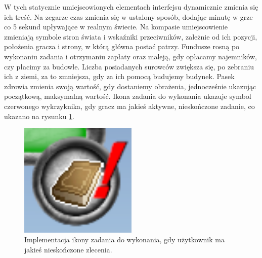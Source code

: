 W tych statycznie umiejscowionych elementach interfejsu dynamicznie zmienia się ich treść. Na zegarze czas zmienia się w ustalony sposób,
dodając minutę w grze co 5 sekund upływające w realnym świecie. Na kompasie umiejscowienie zmieniają symbole stron świata i wskaźniki przeciwników,
zależnie od ich pozycji, położenia gracza i strony, w którą główna postać patrzy. Fundusze rosną po wykonaniu zadania i otrzymaniu zapłaty oraz maleją, gdy opłacamy
najemników, czy płacimy za budowle. Liczba posiadanych surowców zwiększa się, po zebraniu ich z ziemi, za to zmniejsza, gdy za ich pomocą budujemy budynek.  
Pasek zdrowia zmienia swoją wartość, gdy dostaniemy obrażenia, jednocześnie ukazując początkową, maksymalną wartość. Ikona zadania do wykonania ukazuje symbol 
czerwonego wykrzyknika, gdy gracz ma jakieś aktywne, nieskończone zadanie, co ukazano na rysunku \ref{fig:wyq}.
\begin{figure}[htbp]
    \centering
    \includegraphics[width=0.5\textwidth]{images/ui/wykrzyknik_quest.png}
    \caption{Implementacja ikony zadania do wykonania, gdy użytkownik ma jakieś nieskończone zlecenia.
    }\label{fig:wyq}
\end{figure}
\FloatBarrier

